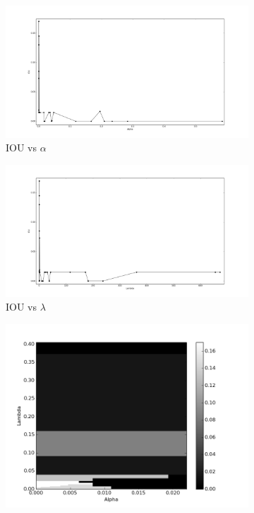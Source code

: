 \begin{figure}[h]
	\centering
	\begin{subfigure}{0.32\textwidth}
		\centering
                \includegraphics[width=\textwidth]{plots/hs1_alpha.png}
         \caption{IOU vs $\alpha$}
	\end{subfigure}
	\begin{subfigure}{0.32\textwidth}
		\centering
                \includegraphics[width=\textwidth]{plots/hs1_lambda.png}
         \caption{IOU vs $\lambda$}
	\end{subfigure}
	\begin{subfigure}{0.32\textwidth}
		\centering
                \includegraphics[width=\textwidth]{plots/hs1_pcolor.png}

\end{subfigure}
\end{figure}
